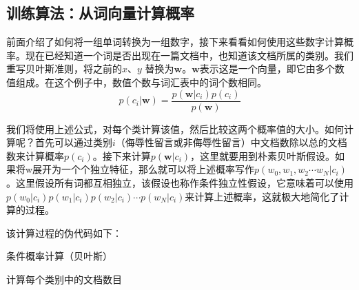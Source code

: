 \subsection{训练算法：从词向量计算概率}
前面介绍了如何将一组单词转换为一组数字，接下来看看如何使用这些数字计算概率。现在已经知道一个词是否出现在一篇文档中，也知道该文档所属的类别。我们重写贝叶斯准则，将之前的$x$、$y$ 替换为$\bm{w}$。$\bm{w}$表示这是一个向量，即它由多个数值组成。在这个例子中，数值个数与词汇表中的词个数相同。
\begin{equation*}
    p(c_i|\bm{w})=\frac{p(\bm{w}|c_i)p(c_i)}{p(\bm{w})}
\end{equation*}

我们将使用上述公式，对每个类计算该值，然后比较这两个概率值的大小。如何计算呢？首先可以通过类别$i$（侮辱性留言或非侮辱性留言）中文档数除以总的文档数来计算概率$p(c_i)$。接下来计算$p(\bm{w}|c_i)$，这里就要用到朴素贝叶斯假设。如果将w展开为一个个独立特征，那么就可以将上述概率写作$p(w_0,w_1,w_2\cdots w_N|c_i)$。这里假设所有词都互相独立，该假设也称作条件独立性假设，它意味着可以使用$p(w_0|c_i)p(w_1|c_i)p(w_2|c_i)\cdots p(w_N|c_i)$来计算上述概率，这就极大地简化了计算的过程。

该计算过程的伪代码如下：
\begin{algorithm}
    \caption{条件概率计算（贝叶斯）}
    计算每个类别中的文档数目\;

\end{algorithm}